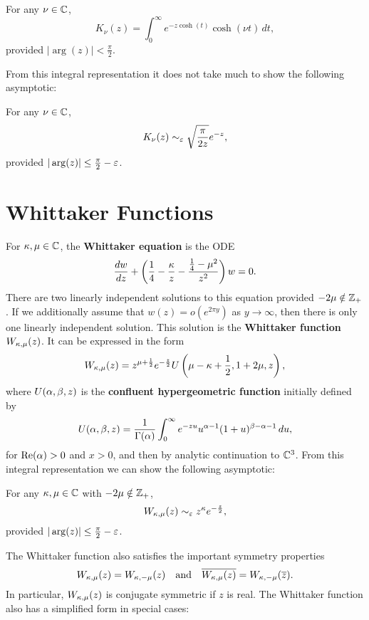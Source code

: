     \begin{proposition}\label{prop:integral_representation_K-Bessel_function}
      For any $\nu \in \mathbb{C}$,
      \[
        K_{\nu}(z) = \int_{0}^{\infty}e^{-z\cosh(t)}\cosh(\nu t)\,dt,
      \]
      provided $|\arg(z)| < \frac{\pi}{2}$.
    \end{proposition}

    From this integral representation it does not take much to show the following asymptotic:

    \begin{lemma}\label{lem:K_Bessel_function_asymptotic}
      For any $\nu \in \mathbb{C}$,
      \[
        K_{\nu}(z) \sim_{\varepsilon} \sqrt{\frac{\pi}{2z}}e^{-z},
      \]
      provided $|\arg(z)| \le \frac{\pi}{2}-\varepsilon$.
    \end{lemma}
  \section{Whittaker Functions}\label{append:Whittaker_Functions}
    For $\kappa,\mu \in \mathbb{C}$, the \textbf{Whittaker equation} is the ODE
    \[
      \frac{dw}{dz}+\left(\frac{1}{4}-\frac{\kappa}{z}-\frac{\frac{1}{4}-\mu^{2}}{z^{2}}\right)w = 0.
    \]
    There are two linearly independent solutions to this equation provided $-2\mu \notin \mathbb{Z}_{+}$. If we additionally assume that $w(z) = o(e^{2\pi y})$ as $y \to \infty$, then there is only one linearly independent solution. This solution is the \textbf{Whittaker function} $W_{\kappa,\mu}(z)$. It can be expressed in the form
    \[
      W_{\kappa,\mu}(z) = z^{\mu+\frac{1}{2}}e^{-\frac{z}{2}}U\left(\mu-\kappa+\frac{1}{2},1+2\mu,z\right),
    \]
    where $U(\alpha,\beta,z)$ is the \textbf{confluent hypergeometric function} initially defined by
    \[
      U(\alpha,\beta,z) = \frac{1}{\Gamma(\alpha)}\int_{0}^{\infty}e^{-zu}u^{\alpha-1}(1+u)^{\beta-\alpha-1}\,du,
    \]
    for $\mathrm{Re}(\alpha) > 0$ and $x > 0$, and then by analytic continuation to $\mathbb{C}^{3}$. From this integral representation we can show the following asymptotic:

    \begin{lemma}\label{lem:Whittaker_function_asymptotic}
      For any $\kappa,\mu \in \mathbb{C}$ with $-2\mu \notin \mathbb{Z}_{+}$,
      \[
        W_{\kappa,\mu}(z) \sim_{\varepsilon} z^{\kappa}e^{-\frac{z}{2}},
      \]
      provided $|\arg(z)| \le \frac{\pi}{2}-\varepsilon$.
    \end{lemma}

    The Whittaker function also satisfies the important symmetry properties
    \[
      W_{\kappa,\mu}(z) = W_{\kappa,-\mu}(z) \quad \text{and} \quad \overline{W_{\kappa,\mu}(z)} = W_{\kappa,-\mu}(\overline{z}).
    \]
    In particular, $W_{\kappa,\mu}(z)$ is conjugate symmetric if $z$ is real. The Whittaker function also has a simplified form in special cases:
    

